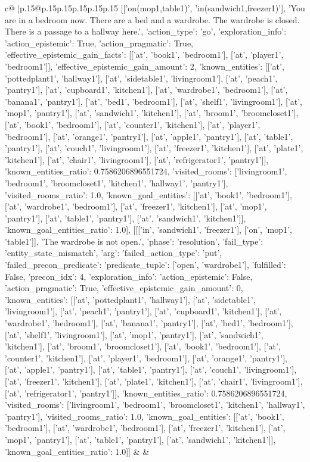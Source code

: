 \documentclass{article}
\begin{document}
{\begin{supertabular}{c@{$\;$}|p{.15\linewidth}@{}p{.15\linewidth}p{.15\linewidth}p{.15\linewidth}p{.15\linewidth}p{.15\linewidth}}
{{{[['on(mop1,table1)', 'in(sandwich1,freezer1)'], 'You are in a bedroom now. There are a bed and a wardrobe. The wardrobe is closed. There is a passage to a hallway here.', {'action_type': 'go', 'exploration_info': {'action_epistemic': True, 'action_pragmatic': True, 'effective_epistemic_gain_facts': [['at', 'book1', 'bedroom1'], ['at', 'player1', 'bedroom1']], 'effective_epistemic_gain_amount': 2, 'known_entities': [['at', 'pottedplant1', 'hallway1'], ['at', 'sidetable1', 'livingroom1'], ['at', 'peach1', 'pantry1'], ['at', 'cupboard1', 'kitchen1'], ['at', 'wardrobe1', 'bedroom1'], ['at', 'banana1', 'pantry1'], ['at', 'bed1', 'bedroom1'], ['at', 'shelf1', 'livingroom1'], ['at', 'mop1', 'pantry1'], ['at', 'sandwich1', 'kitchen1'], ['at', 'broom1', 'broomcloset1'], ['at', 'book1', 'bedroom1'], ['at', 'counter1', 'kitchen1'], ['at', 'player1', 'bedroom1'], ['at', 'orange1', 'pantry1'], ['at', 'apple1', 'pantry1'], ['at', 'table1', 'pantry1'], ['at', 'couch1', 'livingroom1'], ['at', 'freezer1', 'kitchen1'], ['at', 'plate1', 'kitchen1'], ['at', 'chair1', 'livingroom1'], ['at', 'refrigerator1', 'pantry1']], 'known_entities_ratio': 0.7586206896551724, 'visited_rooms': ['livingroom1', 'bedroom1', 'broomcloset1', 'kitchen1', 'hallway1', 'pantry1'], 'visited_rooms_ratio': 1.0, 'known_goal_entities': [['at', 'book1', 'bedroom1'], ['at', 'wardrobe1', 'bedroom1'], ['at', 'freezer1', 'kitchen1'], ['at', 'mop1', 'pantry1'], ['at', 'table1', 'pantry1'], ['at', 'sandwich1', 'kitchen1']], 'known_goal_entities_ratio': 1.0}}], [[['in', 'sandwich1', 'freezer1'], ['on', 'mop1', 'table1']], 'The wardrobe is not open.', {'phase': 'resolution', 'fail_type': 'entity_state_mismatch', 'arg': {'failed_action_type': 'put', 'failed_precon_predicate': {'predicate_tuple': ['open', 'wardrobe1'], 'fulfilled': False, 'precon_idx': 4}}, 'exploration_info': {'action_epistemic': False, 'action_pragmatic': True, 'effective_epistemic_gain_amount': 0, 'known_entities': [['at', 'pottedplant1', 'hallway1'], ['at', 'sidetable1', 'livingroom1'], ['at', 'peach1', 'pantry1'], ['at', 'cupboard1', 'kitchen1'], ['at', 'wardrobe1', 'bedroom1'], ['at', 'banana1', 'pantry1'], ['at', 'bed1', 'bedroom1'], ['at', 'shelf1', 'livingroom1'], ['at', 'mop1', 'pantry1'], ['at', 'sandwich1', 'kitchen1'], ['at', 'broom1', 'broomcloset1'], ['at', 'book1', 'bedroom1'], ['at', 'counter1', 'kitchen1'], ['at', 'player1', 'bedroom1'], ['at', 'orange1', 'pantry1'], ['at', 'apple1', 'pantry1'], ['at', 'table1', 'pantry1'], ['at', 'couch1', 'livingroom1'], ['at', 'freezer1', 'kitchen1'], ['at', 'plate1', 'kitchen1'], ['at', 'chair1', 'livingroom1'], ['at', 'refrigerator1', 'pantry1']], 'known_entities_ratio': 0.7586206896551724, 'visited_rooms': ['livingroom1', 'bedroom1', 'broomcloset1', 'kitchen1', 'hallway1', 'pantry1'], 'visited_rooms_ratio': 1.0, 'known_goal_entities': [['at', 'book1', 'bedroom1'], ['at', 'wardrobe1', 'bedroom1'], ['at', 'freezer1', 'kitchen1'], ['at', 'mop1', 'pantry1'], ['at', 'table1', 'pantry1'], ['at', 'sandwich1', 'kitchen1']], 'known_goal_entities_ratio': 1.0}}]] 
	  } 
	   } 
	   } 
	 & & \\ 
 


\end{supertabular}}
\end{document}
